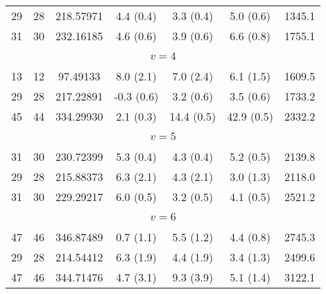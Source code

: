 \begin{table*}[htp]
\begin{tabular}{ccccccc}
 29 & 28 & 218.57971 & 4.4 (0.4) & 3.3 (0.4) & 5.0 (0.6) & 1345.1 \\
 31 & 30 & 232.16185 & 4.6 (0.6) & 3.9 (0.6) & 6.6 (0.8) & 1755.1 \\
&\vspace{-0.75em}\\
\multicolumn{7}{c}{$v = 4$} \\
\vspace{-0.75em}\\
 13 & 12 & 97.49133 & 8.0 (2.1) & 7.0 (2.4) & 6.1 (1.5) & 1609.5 \\
 29 & 28 & 217.22891 & -0.3 (0.6) & 3.2 (0.6) & 3.5 (0.6) & 1733.2 \\
 45 & 44 & 334.29930 & 2.1 (0.3) & 14.4 (0.5) & 42.9 (0.5) & 2332.2 \\
&\vspace{-0.75em}\\
\multicolumn{7}{c}{$v = 5$} \\
\vspace{-0.75em}\\
 31 & 30 & 230.72399 & 5.3 (0.4) & 4.3 (0.4) & 5.2 (0.5) & 2139.8 \\
 29 & 28 & 215.88373 & 6.3 (2.1) & 4.3 (2.1) & 3.0 (1.3) & 2118.0 \\
 31 & 30 & 229.29217 & 6.0 (0.5) & 3.2 (0.5) & 4.1 (0.5) & 2521.2 \\
&\vspace{-0.75em}\\
\multicolumn{7}{c}{$v = 6$} \\
\vspace{-0.75em}\\
 47 & 46 & 346.87489 & 0.7 (1.1) & 5.5 (1.2) & 4.4 (0.8) & 2745.3 \\
 29 & 28 & 214.54412 & 6.3 (1.9) & 4.4 (1.9) & 3.4 (1.3) & 2499.6 \\
 47 & 46 & 344.71476 & 4.7 (3.1) & 9.3 (3.9) & 5.1 (1.4) & 3122.1 \\
\hline
\end{tabular}

\par 
\end{table*}
